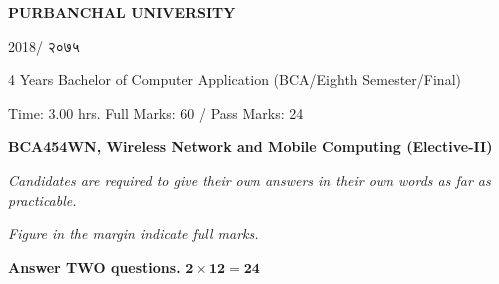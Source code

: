 \documentclass[a4paper, twoside, 12pt, noanswers]{exam}
\newcommand{\textnp}{\texthindi}
\begin{document}
\begin{framed}
	\raggedright{\bfseries\Large\centering PURBANCHAL UNIVERSITY \par {2018/ \textnp{२०७५}}\par}
	{ 4 Years Bachelor of Computer Application (BCA/Eighth Semester/Final)\par}
	{ Time: 3.00 hrs.  \hfill Full Marks: 60 / Pass Marks: 24\par}
	{\bfseries {BCA454WN, Wireless Network and Mobile Computing (Elective-II) \hfill}\par}
\end{framed}

{\noindent \it{Candidates are required to give their own answers in their own words as far as practicable.  }\par}
{\noindent \it{Figure in the margin indicate full marks.}\par}

{}
{\hspace*{-0.5cm} \bfseries Answer TWO questions.} \hfill {\( \mathbf{2\times 12 =24}\)}
\end{document}
